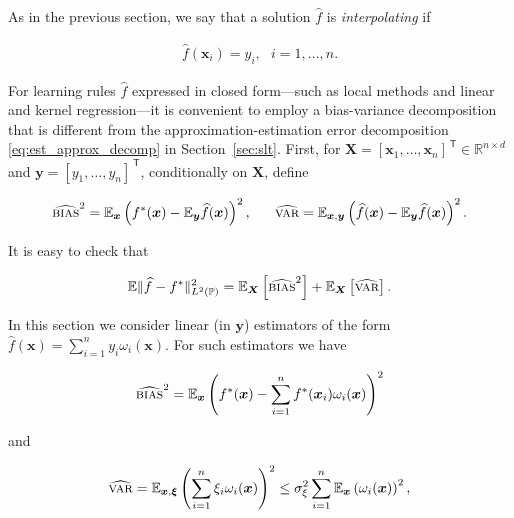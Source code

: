 As in the previous section, we say that a solution $\widehat{f}$ is \emph{interpolating} if

\begin{align}
	\widehat{f}({\boldsymbol x}_i) = y_i, ~~~ i=1,\ldots,n.
\end{align}

For learning rules $\widehat{f}$ expressed in closed form---such as local methods and linear and kernel regression---it is convenient to employ a bias-variance decomposition that is different from the approximation-estimation error decomposition \eqref{eq:est_approx_decomp} in Section~\ref{sec:slt}.
First, for ${\boldsymbol X} = [{\boldsymbol x}_1,\ldots,{\boldsymbol x}_n]^\ensuremath{{\scriptscriptstyle\mathsf{\,T}}}\in {\mathbb R}^{n\times d}$ and
${\boldsymbol y}=[y_1,\ldots,y_n]^\ensuremath{{\scriptscriptstyle\mathsf{\,T}}}$, conditionally on ${\boldsymbol X}$, define

\begin{align}
	\label{eq:emp_bias_var_def}
	{\widehat{\textsc{bias}}^2} = \mathbb{E}_{\boldsymbol x}\left(f^*({\boldsymbol x}) - \mathbb{E}_{{\boldsymbol y}} \widehat{f}({\boldsymbol x})\right)^2,~~~~~ {\widehat{\textsc{var}}} = \mathbb{E}_{{\boldsymbol x},{\boldsymbol y}}\left(\widehat{f}({\boldsymbol x}) - \mathbb{E}_{{\boldsymbol y}} \widehat{f}({\boldsymbol x})\right)^2.
\end{align}

It is easy to check that

\begin{align}
	\mathbb{E}\|\widehat{f}-f^*\|^2_{L^2(\mathbb{P})} = \mathbb{E}_{{\boldsymbol X}} \left[ {\widehat{\textsc{bias}}^2} \right] + \mathbb{E}_{{\boldsymbol X}} \left[{\widehat{\textsc{var}}}\right].
\end{align}

In this section we consider linear (in ${\boldsymbol y}$) estimators of the form
$\widehat{f}({\boldsymbol x}) = \sum_{i=1}^n y_i \omega_i({\boldsymbol x}).$ For such estimators we have

\begin{equation}\label{eqn:bias}
{\widehat{\textsc{bias}}^2} = \mathbb{E}_{\boldsymbol x}\left(f^*({\boldsymbol x})- \sum_{i=1}^n f^*({\boldsymbol x}_i) \omega_i({\boldsymbol x})\right)^2
\end{equation}

and

\begin{equation}\label{eqn:var}
{\widehat{\textsc{var}}} = \mathbb{E}_{{\boldsymbol x},\boldsymbol{\xi}}\left(\sum_{i=1}^n \xi_i
\omega_i({\boldsymbol x})\right)^2 \leq \sigma^2_\xi \sum_{i=1}^n
\mathbb{E}_{\boldsymbol x}\left(\omega_i({\boldsymbol x})\right)^2,
\end{equation}

